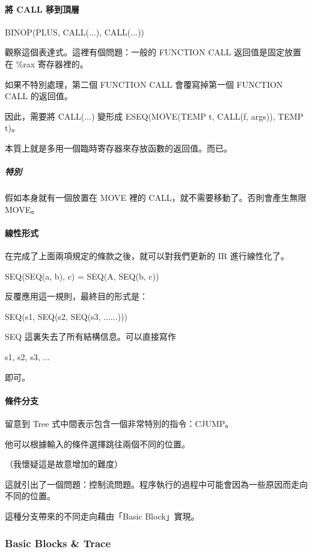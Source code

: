\documentclass[
]{article}
\begin{document}
\hypertarget{header-n221}{%
\paragraph{將 CALL 移到頂層}\label{header-n221}}

BINOP(PLUS, CALL(...), CALL(...))

觀察這個表達式。這裡有個問題：一般的 FUNCTION CALL 返回值是固定放置在
\%rax 寄存器裡的。

如果不特別處理，第二個 FUNCTION CALL 會覆寫掉第一個 FUNCTION CALL
的返回值。

因此，需要將 CALL(...) 變形成 ESEQ(MOVE(TEMP t, CALL(f, args)), TEMP
t)。

本質上就是多用一個臨時寄存器來存放函數的返回值。而已。

\hypertarget{header-n227}{%
\subparagraph{特別}\label{header-n227}}

假如本身就有一個放置在 MOVE 裡的 CALL，就不需要移動了。否則會產生無限
MOVE。

\hypertarget{header-n229}{%
\paragraph{線性形式}\label{header-n229}}

在完成了上面兩項規定的條款之後，就可以對我們更新的 IR 進行線性化了。

SEQ(SEQ(a, b), c) = SEQ(A, SEQ(b, c))

反覆應用這一規則，最終目的形式是：

SEQ(s1, SEQ(s2, SEQ(s3, ......)))

SEQ 這裏失去了所有結構信息。可以直接寫作

s1, s2, s3, ...

即可。

\hypertarget{header-n237}{%
\paragraph{條件分支}\label{header-n237}}

留意到 Tree 式中間表示包含一個非常特別的指令：CJUMP。

他可以根據輸入的條件選擇跳往兩個不同的位置。

（我懷疑這是故意增加的難度）

這就引出了一個問題：控制流問題。程序執行的過程中可能會因為一些原因而走向不同的位置。

這種分支帶來的不同走向藉由「Basic Block」實現。

\hypertarget{header-n243}{%
\subsubsection{Basic Blocks \& Trace}\label{header-n243}}
\end{document}
